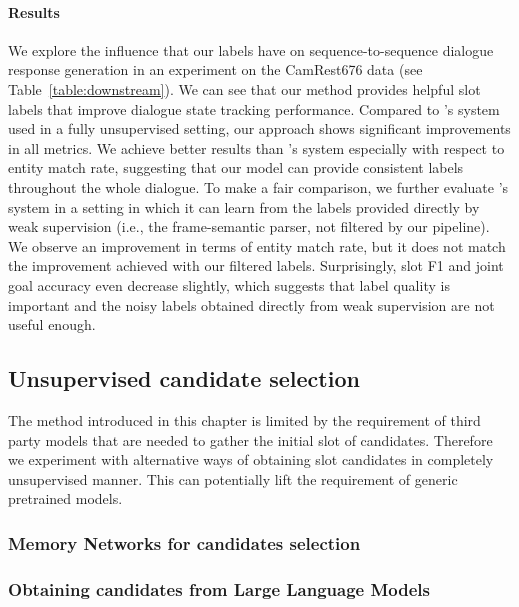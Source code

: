 \paragraph{Results} We explore the influence that our labels have on sequence-to-sequence dialogue response generation in an experiment on the CamRest676 data (see Table~\ref{table:downstream}).
We can see that our method provides helpful slot labels that improve dialogue state tracking performance.
Compared to \citet{jin2018explicit}'s system used in a fully unsupervised setting, our approach shows significant improvements in all metrics.
We achieve better results than \citet{jin2018explicit}'s system especially with respect to entity match rate, suggesting that our model can provide consistent labels throughout the whole dialogue.
To make a fair comparison, we further evaluate \citet{jin2018explicit}'s system in a setting in which it can learn from the labels provided directly by weak supervision (i.e., the frame-semantic parser, not filtered by our pipeline).
We observe an improvement in terms of entity match rate, but it does not match the improvement achieved with our filtered labels. Surprisingly, slot F1 and joint goal accuracy even decrease slightly, 
which suggests that label quality is important and the noisy labels obtained directly from weak supervision are not useful enough.

\subsection{Unsupervised candidate selection}
The method introduced in this chapter is limited by the requirement of third party models that are needed to gather the initial slot of candidates.
Therefore we experiment with alternative ways of obtaining slot candidates in completely unsupervised manner.
This can potentially lift the requirement of generic pretrained models.

\subsubsection{Memory Networks for candidates selection}
\subsubsection{Obtaining candidates from Large Language Models}

